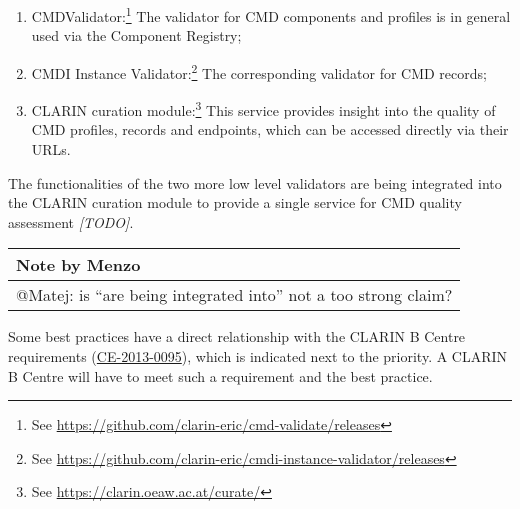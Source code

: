 \documentclass[]{article}
\providecommand{\tightlist}{%
  \setlength{\itemsep}{0pt}\setlength{\parskip}{0pt}}
\begin{document}
\begin{enumerate}
\def\labelenumi{\arabic{enumi}.}
\tightlist
\item
  CMDValidator:\footnote{See
    \url{https://github.com/clarin-eric/cmd-validate/releases}} The
  validator for CMD components and profiles is in general used via the
  Component Registry;
\item
  CMDI Instance Validator:\footnote{See
    \url{https://github.com/clarin-eric/cmdi-instance-validator/releases}}
  The corresponding validator for CMD records;
\item
  CLARIN curation module:\footnote{See
    \url{https://clarin.oeaw.ac.at/curate/}} This service provides
  insight into the quality of CMD profiles, records and endpoints, which
  can be accessed directly via their URLs.
\end{enumerate}

The functionalities of the two more low level validators are being
integrated into the CLARIN curation module to provide a single service
for CMD quality assessment \emph{{[}TODO{]}}.

\begin{longtable}[c]{@{}l@{}}
\toprule
Note by Menzo\tabularnewline
\midrule
\endhead
@Matej: is ``are being integrated into'' not a too strong
claim?\tabularnewline
\bottomrule
\end{longtable}

Some best practices have a direct relationship with the CLARIN B Centre
requirements (\href{http://hdl.handle.net/11372/DOC-78}{CE-2013-0095}),
which is indicated next to the priority. A CLARIN B Centre will have to
meet such a requirement and the best practice.
\end{document}
